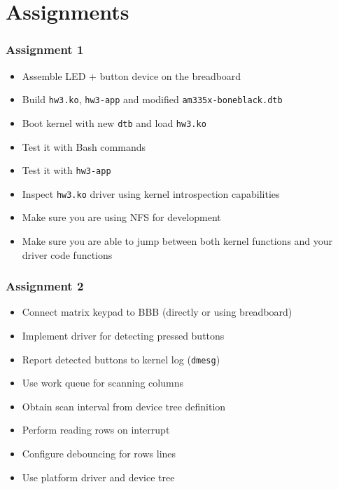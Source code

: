 \section{Assignments}

\begin{frame}
  \frametitle{Assignment 1}
  \begin{itemize}
    \item Assemble LED + button device on the breadboard
    \item Build \texttt{hw3.ko}, \texttt{hw3-app} and modified
          \texttt{am335x-boneblack.dtb}
    \item Boot kernel with new \texttt{dtb} and load \texttt{hw3.ko}
    \item Test it with Bash commands
    \item Test it with \texttt{hw3-app}
    \item Inspect \texttt{hw3.ko} driver using kernel introspection capabilities
    \item Make sure you are using NFS for development
    \item Make sure you are able to jump between both kernel functions and
          your driver code functions
  \end{itemize}
\end{frame}

\begin{frame}
  \frametitle{Assignment 2}
  \begin{itemize}
    \item Connect matrix keypad to BBB (directly or using breadboard)
    \item Implement driver for detecting pressed buttons
    \item Report detected buttons to kernel log (\texttt{dmesg})
    \item Use work queue for scanning columns
    \item Obtain scan interval from device tree definition
    \item Perform reading rows on interrupt
    \item Configure debouncing for rows lines
    \item Use platform driver and device tree
  \end{itemize}
\end{frame}

